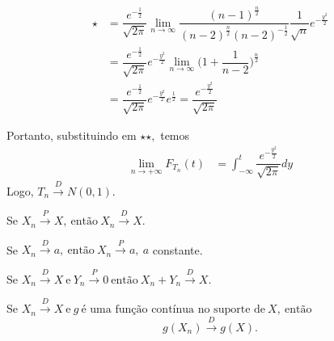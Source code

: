 \documentclass[12pt]{beamer}
\begin{document}
\begin{frame}{}
\begin{block}{}
\justifying
\begin{align*}
    \star&=\dfrac{e^{-\frac{1}{2}}}{\sqrt{2\pi}}{\displaystyle \lim_{n\rightarrow\infty}\dfrac{(n-1)^{\frac{n}{2}}}{(n-2)^{\frac{n}{2}}(n-2)^{-\frac{1}{2}}}}\dfrac{1}{\sqrt{n}}e^{-\frac{y^{2}}{2}}\\
    &=\dfrac{e^{-\frac{1}{2}}}{\sqrt{2\pi}}e^{-\frac{y^{2}}{2}}{\displaystyle \lim_{n\rightarrow\infty}\Big(1+\dfrac{1}{n-2}\Big)^{\frac{n}{2}}}\\
    &=\dfrac{e^{-\frac{1}{2}}}{\sqrt{2\pi}}e^{-\frac{y^{2}}{2}}e^{\frac{1}{2}}=\dfrac{e^{-\frac{y^{2}}{2}}}{\sqrt{2\pi}}
\end{align*}
\end{block}
\pause
\begin{block}{}
\justifying
Portanto, substituindo em $\star\star,$ temos 
\begin{align*}
\lim_{n\rightarrow+\infty}F_{T_{n}}(t)&=\int_{-\infty}^{t}\dfrac{e^{-\frac{y^{2}}{2}}}{\sqrt{2\pi}}dy
\end{align*}
Logo, $T_{n} \overset{D}{\rightarrow} N(0,1).$
\end{block}
\end{frame}

\begin{frame}{}
\begin{Teorema}
\justifying
Se $X_{n} \overset{P}{\rightarrow} X,~\text{então}~X_{n} \overset{D}{\rightarrow} X.$
\end{Teorema}
\end{frame}

\begin{frame}{}
\begin{Teorema}
\justifying
Se $X_{n} \overset{D}{\rightarrow} a,~\text{então}~X_{n} \overset{P}{\rightarrow} a,~a$ constante.
\end{Teorema}
\end{frame}

\begin{frame}{}
\begin{Teorema}
\justifying
Se $X_{n} \overset{D}{\rightarrow} X~\text{e}~Y_{n} \overset{P}{\rightarrow} 0~\text{então}~X_{n}+Y_{n} \overset{D}{\rightarrow} X.$
\end{Teorema}
\end{frame}

\begin{frame}{}
\begin{Teorema}
\justifying
Se $X_{n} \overset{D}{\rightarrow} X~\text{e}~g~\text{é uma função contínua no suporte de}~X,~\text{então}~$ $$g(X_{n}) \overset{D}{\rightarrow} g(X).$$
\end{Teorema}
\end{frame}
\end{document}
